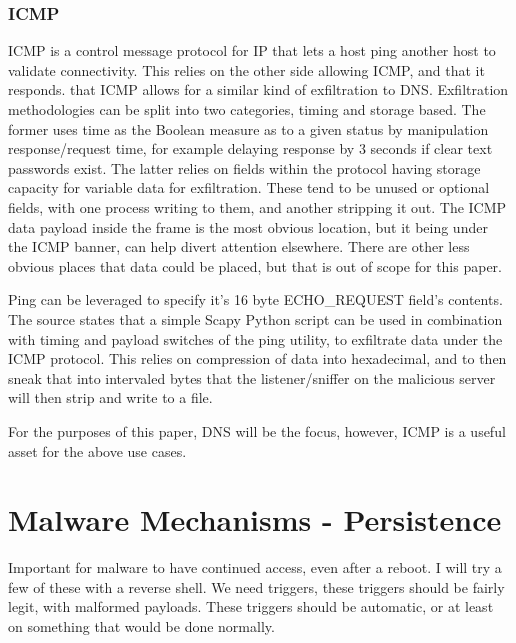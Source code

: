 \subsection{ICMP}
ICMP is a control message protocol for IP that lets a host ping another host to validate connectivity. This relies on the other side allowing ICMP, and that it responds. that ICMP allows for a similar kind of exfiltration to DNS. Exfiltration methodologies can be split into two categories, timing and storage based. The former uses time as the Boolean measure as to a given status by manipulation response/request time, for example delaying response by 3 seconds if clear text passwords exist.
The latter relies on fields within the protocol having storage capacity for variable data for exfiltration. These tend to be unused or optional fields, with one process writing to them, and another stripping it out. The ICMP data payload inside the frame is the most obvious location, but it being under the ICMP banner, can help divert attention elsewhere. There are other less obvious places that data could be placed, but that is out of scope for this paper. \citep{ICMPExfiltration}

Ping can be leveraged to specify it's 16 byte ECHO\_REQUEST field's contents. The source states that a simple Scapy Python script can be used in combination with timing and payload switches of the ping utility, to exfiltrate data under the ICMP protocol. This relies on compression of data into hexadecimal, and to then sneak that into intervaled bytes that the listener/sniffer on the malicious server will then strip and write to a file. \citep{pingExfil}

For the purposes of this paper, DNS will be the focus, however, ICMP is a useful asset for the above use cases.




\chapter{Malware Mechanisms - Persistence}
Important for malware to have continued access, even after a reboot. I will try a few of these with a reverse shell. 
We need triggers, these triggers should be fairly legit, with malformed payloads. These triggers should be automatic, or at least on something that would be done normally.

